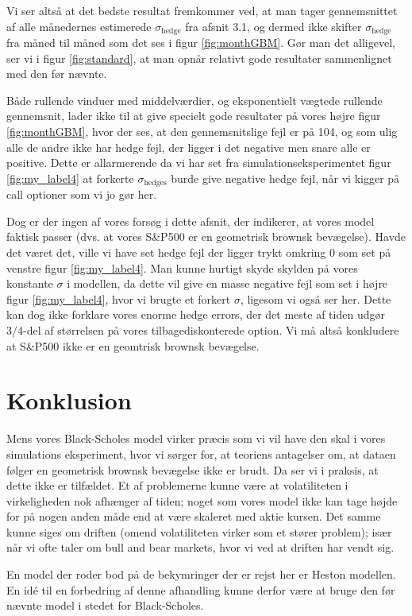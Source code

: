 \documentclass{article}
\theoremstyle{definition}
\theoremstyle{remark}
\begin{document}
Vi ser altså at det bedste resultat fremkommer ved, at man tager gennemsnittet af alle månedernes estimerede $\sigma_\text{hedge}$ fra afsnit 3.1, og dermed ikke skifter $\sigma_\text{hedge}$ fra måned til måned som det ses i figur \ref{fig:monthGBM}. Gør man det alligevel, ser vi i figur \ref{fig:standard}, at man opnår relativt gode resultater sammenlignet med den før nævnte.

Både rullende vinduer med middelværdier, og eksponentielt vægtede rullende gennemsnit, lader ikke til at give specielt gode resultater på vores højre figur \ref{fig:monthGBM}, hvor der ses, at den gennemsnitslige fejl er på 104, og som ulig alle de andre ikke har hedge fejl, der ligger i det negative men snare alle er positive. Dette er allarmerende da vi har set fra simulationseksperimentet figur \ref{fig:my_label4} at forkerte $\sigma_\text{hedges}$ burde give negative hedge fejl, når vi kigger på call optioner som vi jo gør her.

Dog er der ingen af vores forsøg i dette afsnit, der indikerer, at vores model faktisk passer (dvs. at vores S\&P500 er en geometrisk brownsk bevægelse). Havde det været det, ville vi have set hedge fejl der ligger trykt omkring 0 som set på venstre figur \ref{fig:my_label4}. Man kunne hurtigt skyde skylden på vores konstante $\sigma$ i modellen, da dette vil give en masse negative fejl som set i højre figur \ref{fig:my_label4}, hvor vi brugte et forkert $\sigma$, ligesom vi også ser her. Dette kan dog ikke forklare vores enorme hedge errors, der det meste af tiden udgør 3/4-del af størrelsen på vores tilbagediskonterede option. Vi må altså konkludere at S\&P500 ikke er en geomtrisk brownsk bevægelse.
\newpage
\section{Konklusion}
Mens vores Black-Scholes model virker præcis som vi vil have den skal i vores simulations eksperiment, hvor vi sørger for, at teoriens antagelser om, at dataen følger en geometrisk brownsk bevægelse ikke er brudt. Da ser vi i praksis, at dette ikke er tilfældet. Et af problemerne kunne være at volatiliteten i virkeligheden nok afhænger af tiden; noget som vores model ikke kan tage højde for på nogen anden måde end at være skaleret med aktie kursen. Det samme kunne siges om driften (omend volatiliteten virker som et stører problem); især når vi ofte taler om bull and bear markets, hvor vi ved at driften har vendt sig.

En model der roder bod på de bekymringer der er rejst her er Heston modellen. En idé til en forbedring af denne afhandling kunne derfor være at bruge den før nævnte model i stedet for Black-Scholes.
\newpage





\end{document}

